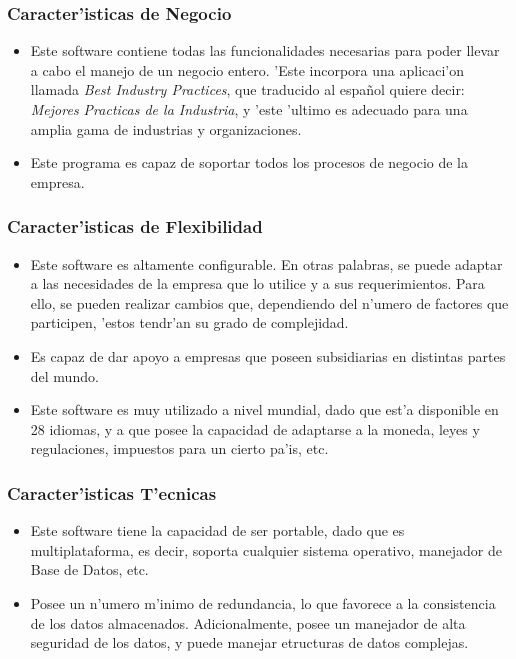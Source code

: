 \subsubsection*{Caracter'isticas de Negocio}
\begin{itemize}
\item Este software contiene todas las funcionalidades necesarias para poder llevar a cabo el manejo de un negocio entero. 'Este incorpora una aplicaci'on llamada \textit{Best Industry Practices}, que traducido al espa\~nol quiere decir: \textit{Mejores Practicas de la Industria}, y 'este 'ultimo es adecuado para una amplia gama de industrias y organizaciones.
\item Este programa es capaz de soportar todos los procesos de negocio de la empresa.
\end{itemize}

\subsubsection*{Caracter'isticas de Flexibilidad}
\begin{itemize}
\item Este software es altamente configurable. En otras palabras, se puede adaptar a las necesidades de la empresa que lo utilice y a sus requerimientos. Para ello, se pueden realizar cambios que, dependiendo del n'umero de factores que participen, 'estos tendr'an su grado de complejidad.
\item Es capaz de dar apoyo a empresas que poseen subsidiarias en distintas partes del mundo.
\item Este software es muy utilizado a nivel mundial, dado que est'a disponible en 28 idiomas, y a que posee la capacidad de adaptarse a la moneda, leyes y regulaciones, impuestos para un cierto pa'is, etc.
\end{itemize}

\subsubsection*{Caracter'isticas T'ecnicas}
\begin{itemize}
\item Este software tiene la capacidad de ser portable, dado que es multiplataforma, es decir, soporta cualquier sistema operativo, manejador de Base de Datos, etc.
\item Posee un n'umero m'inimo de redundancia, lo que favorece a la consistencia de los datos almacenados. Adicionalmente, posee un manejador de alta seguridad de los datos, y puede manejar etructuras de datos complejas.
\end{itemize}

